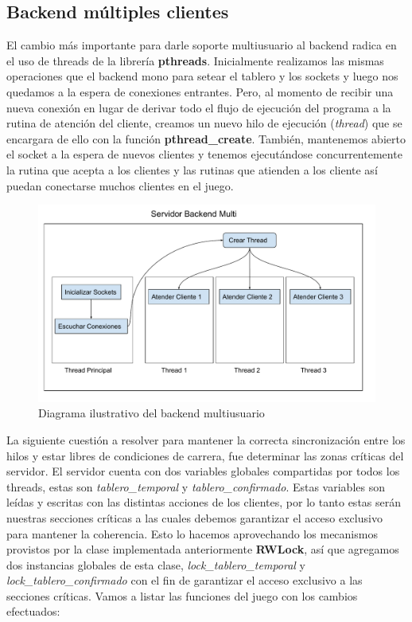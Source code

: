 \subsection{Backend múltiples clientes}

El cambio más importante para darle soporte multiusuario al backend radica en el uso de threads de la librería \textbf{pthreads}. Inicialmente realizamos las mismas operaciones que el backend mono para setear el tablero y los sockets y luego nos quedamos a la espera de conexiones entrantes. Pero, al momento de recibir una nueva conexión en lugar de derivar todo el flujo de ejecución del programa a la rutina de atención del cliente, creamos un nuevo hilo de ejecución (\textit{thread}) que se encargara de ello con la función \textbf{pthread\_create}. También, mantenemos abierto el socket a la espera de nuevos clientes y tenemos ejecutándose concurrentemente la rutina que acepta a los clientes y las rutinas que atienden a los cliente así puedan conectarse muchos clientes en el juego.

\begin{figure}[H]
  \begin{center}
	\includegraphics[scale = 0.4]{./imagenes/so_tp2_2.pdf}
	\caption{Diagrama ilustrativo del backend multiusuario}
	\label{fig:fig2}
  \end{center}
\end{figure}

La siguiente cuestión a resolver para mantener la correcta sincronización entre los hilos y estar libres de condiciones de carrera, fue determinar las zonas críticas del servidor. El servidor cuenta con dos variables globales compartidas por todos los threads, estas son \textit{tablero\_temporal} y \textit{tablero\_confirmado}. Estas variables son leídas y escritas con las distintas acciones de los clientes, por lo tanto estas serán nuestras secciones críticas a las cuales debemos garantizar el acceso exclusivo para mantener la coherencia. Esto lo hacemos aprovechando los mecanismos provistos por la clase implementada anteriormente \textbf{RWLock}, así que agregamos dos instancias globales de esta clase, \textit{lock\_tablero\_temporal} y \textit{lock\_tablero\_confirmado} con el fin de garantizar el acceso exclusivo a las secciones críticas. Vamos a listar las funciones del juego con los cambios efectuados:


